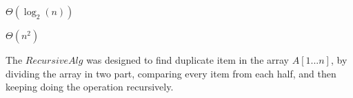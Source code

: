 \begin{homeworkProblem} %

\begin{homeworkSubProblem}
$\Theta\left(\log_2(n)\right)$
\end{homeworkSubProblem}

\begin{homeworkSubProblem}
$\Theta(n^2)$
\end{homeworkSubProblem}

\begin{homeworkSubProblem}
The $RecursiveAlg$ was designed to find duplicate item in the array $A[1...n]$,
by dividing the array in two part, comparing every item from each half, and
then keeping doing the operation recursively.
\end{homeworkSubProblem}

\end{homeworkProblem}
